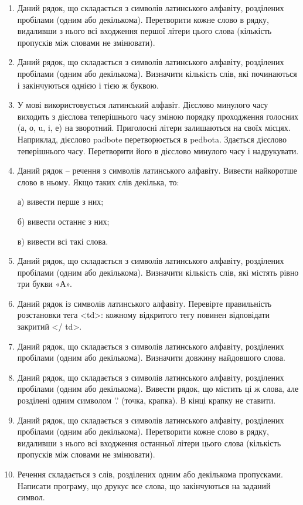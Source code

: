 \documentclass[]{article}
\begin{document}
\begin{enumerate}

\item
Даний рядок, що складається з символів латинського алфавіту, розділених
пробілами (одним або декількома). Перетворити кожне слово в рядку,
видаливши з нього всі входження першої літери цього слова (кількість
пропусків між словами не змінювати).
\item
Даний рядок, що складається з символів латинського алфавіту, розділених
пробілами (одним або декількома). Визначити кількість слів, які
починаються і закінчуються однією і тією ж буквою.
\item
У мові використовується латинський алфавіт. Дієслово минулого часу
виходить з дієслова теперішнього часу зміною порядку проходження
голосних (а, о, u, i, е) на зворотний. Приголосні літери залишаються на
своїх місцях. Наприклад, дієслово padbote перетворюється в pedbota.
Здається дієслово теперішнього часу. Перетворити його в дієслово
минулого часу і надрукувати.
\item
Даний рядок -- речення з символів латинського алфавіту. Вивести
найкоротше слово в ньому. Якщо таких слів декілька, то:

а) вивести перше з них;

б) вивести останнє з них;

в) вивести всі такі слова.
\item
Даний рядок, що складається з символів латинського алфавіту, розділених
пробілами (одним або декількома). Визначити кількість слів, які містять
рівно три букви «А».
\item
Даний рядок із символів латинського алфавіту. Перевірте правильність розстановки тега
\textless{}td\textgreater{}: кожному відкритого тегу повинен відповідати
закритий \textless{}/ td\textgreater{}.

\item
Даний рядок, що складається з символів латинського алфавіту, розділених
пробілами (одним або декількома). Визначити довжину найдовшого слова.
\item
Даний рядок, що складається з
символів латинського алфавіту, розділених пробілами (одним або
декількома). Вивести рядок, що містить ці ж слова, але розділені одним
символом '.' (точка, крапка). В кінці крапку не ставити.
\item
Даний рядок, що складається з символів латинського алфавіту, розділених
пробілами (одним або декількома). Перетворити кожне слово в рядку,
видаливши з нього всі входження останньої літери цього слова (кількість
пропусків між словами не змінювати).
\item
Речення складається з слів, розділених одним або декількома пропусками.
Написати програму, що друкує все слова, що закінчуються на заданий
символ.


\end{enumerate}
\end{document}
